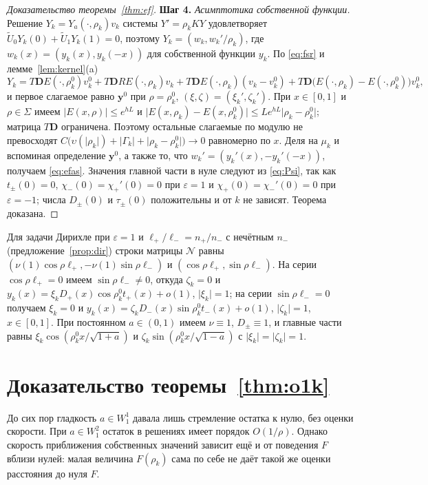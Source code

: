 \documentclass[12pt,a4paper]{article}
\numberwithin{equation}{section}
\theoremstyle{definition}
\newcommand{\step}[1]{\smallskip\noindent\textbf{Шаг #1.}}
\newcommand{\abs}[1]{\lvert#1\rvert}
\newcommand{\Mm}{\mathcal N}
\newcommand{\Dd}{\mathbf D}
\begin{document}
\begin{proof}[Доказательство теоремы~\ref{thm:ef}]
\step{4} \textit{Асимптотика собственной функции.} Решение $Y_k=Y_a(\cdot,\rho_k)v_k$ системы $Y'=\rho_kKY$ удовлетворяет
$\widetilde U_0Y_k(0)+\widetilde U_1Y_k(1)=0$, поэтому $Y_k=(w_k,w_k'/\rho_k)$, где
$w_k(x)=(y_k(x),y_k(-x))$ для собственной функции $y_k$. По \eqref{eq:fsr} и
лемме~\ref{lem:kernel}(a)
\[
 Y_k=T\Dd E(\cdot,\rho_k^0)v_k^0+T\Dd RE(\cdot,\rho_k)v_k+T\Dd E(\cdot,\rho_k)(v_k-v_k^0)
 +T\Dd\bigl(E(\cdot,\rho_k)-E(\cdot,\rho_k^0)\bigr)v_k^0,
\]
и первое слагаемое равно $\mathbf y^0$ при $\rho=\rho_k^0$, $(\xi,\zeta)=(\xi_k',\zeta_k')$. При
$x\in[0,1]$ и $\rho\in\Sigma$ имеем $\abs{E(x,\rho)}\le e^{hL}$ и
$\abs{E(x,\rho_k)-E(x,\rho_k^0)}\le Le^{hL}\abs{\rho_k-\rho_k^0}$; матрица $T\Dd$ ограничена.
Поэтому остальные слагаемые по модулю не превосходят
$C\bigl(\upsilon(\abs{\rho_k})+\abs{\Gamma_k}+\abs{\rho_k-\rho_k^0}\bigr)\to0$ равномерно по $x$.
Деля на $\mu_k$ и вспоминая определение $\mathbf y^0$, а также то, что
$w_k'=(y_k'(x),-y_k'(-x))$, получаем \eqref{eq:efas}. Значения главной части в нуле следуют
из \eqref{eq:Psi}, так как $t_\pm(0)=0$, $\chi_-(0)=\chi_+'(0)=0$ при $\varepsilon=1$ и
$\chi_+(0)=\chi_-'(0)=0$ при $\varepsilon=-1$; числа $D_\pm(0)$ и $\tau_\pm(0)$
положительны и от $k$ не зависят.
Теорема доказана.
\end{proof}

Для задачи Дирихле при $\varepsilon=1$ и $\ell_+/\ell_-=n_+/n_-$ с нечётным $n_-$
(предложение~\ref{prop:dir}) строки матрицы $\Mm$ равны
$(\nu(1)\cos\rho\ell_+,-\nu(1)\sin\rho\ell_-)$ и $(\cos\rho\ell_+,\sin\rho\ell_-)$. На серии
$\cos\rho\ell_+=0$ имеем $\sin\rho\ell_-\ne0$, откуда
$\zeta_k=0$ и $y_k(x)=\xi_kD_+(x)\cos\rho_k^0t_+(x)+o(1)$, $\abs{\xi_k}=1$; на серии
$\sin\rho\ell_-=0$ получаем $\xi_k=0$ и
$y_k(x)=\zeta_kD_-(x)\sin\rho_k^0t_-(x)+o(1)$, $\abs{\zeta_k}=1$, $x\in[0,1]$. При постоянном
$a\in(0,1)$ имеем $\nu\equiv1$, $D_\pm\equiv1$, и главные части равны
$\xi_k\cos(\rho_k^0x/\sqrt{1+a})$ и $\zeta_k\sin(\rho_k^0x/\sqrt{1-a})$ с $\abs{\xi_k}=\abs{\zeta_k}=1$.

\section{Доказательство теоремы~\ref{thm:o1k}}

До сих пор гладкость $a\in W^1_1$ давала лишь стремление остатка к нулю,
без оценки скорости. При $a\in W^2_1$ остаток в решениях имеет порядок
$O(1/\rho)$. Однако скорость приближения собственных значений зависит ещё
и от поведения $F$ вблизи нулей: малая величина $F(\rho_k)$ сама по себе
не даёт такой же оценки расстояния до нуля $F$.
\end{document}
